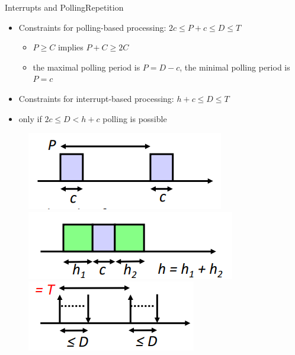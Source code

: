 \begin{frame}{Interrupts and Polling}{Repetition}
  \begin{itemize}
    \item \alert{Constraints for polling-based processing:} $2c \le P+c \le D \le T$
      \begin{itemize}
        \item  $P \ge C$ implies $P + C \ge 2C$
        \item the \alert{maximal polling period} is $P = D-c$, the \alert{minimal polling period} is $P = c$
      \end{itemize}
    \item \alert{Constraints for interrupt-based processing:} $h+c \le D\le T$
    \item only if $2c \le D < h+c$ \alert{polling is possible}
  \end{itemize}
  \begin{figure}
    \centering
    \includegraphics[width=0.2\paperwidth]{./figures/polling_based.png}
    \includegraphics[width=0.2\paperwidth]{./figures/interrupt_based.png}
    \includegraphics[width=0.2\paperwidth]{./figures/deadline.png}
  \end{figure}
\end{frame}

\setcounter{task}{1}

